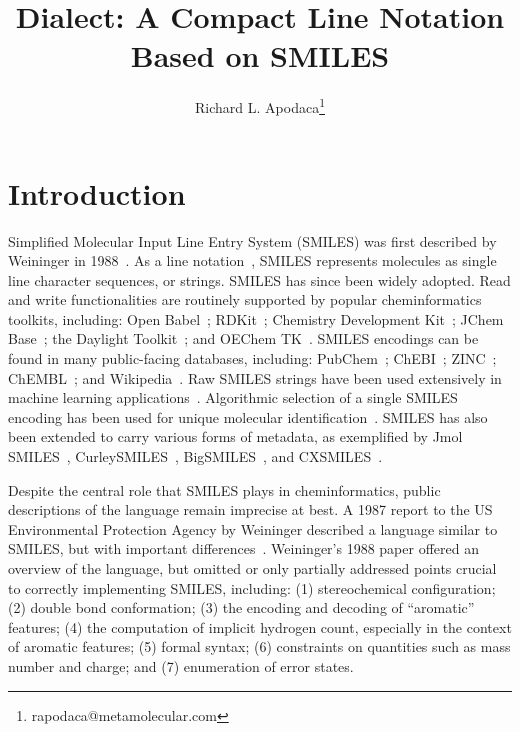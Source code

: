 \documentclass{article}
\begin{document}
\lstset{basicstyle=\ttfamily,breaklines=true}


\title{Dialect: A Compact Line Notation Based on SMILES}
\author{Richard L. Apodaca\thanks{rapodaca@metamolecular.com}}

\maketitle

\section*{Introduction}

Simplified Molecular Input Line Entry System (SMILES) was first described by Weininger in 1988~\cite{weininger:1988}. As a line notation~\cite{wiswesser:1968}, SMILES represents molecules as single line character sequences, or strings. SMILES has since been widely adopted. Read and write functionalities are routinely supported by popular cheminformatics toolkits, including: Open Babel~\cite{oBoyle:2011}; RDKit~\cite{rdkit}; Chemistry Development Kit~\cite{steinbeck:2003}; JChem Base~\cite{jchemBase}; the Daylight Toolkit~\cite{daylightToolkit}; and OEChem TK~\cite{oetk}. SMILES encodings can be found in many public-facing databases, including: PubChem~\cite{kim:2016}; ChEBI~\cite{degtyarenko:2007}; ZINC~\cite{irwin:2005}; ChEMBL~\cite{gaulton:2012}; and Wikipedia~\cite{wikipediaCAS}. Raw SMILES strings have been used extensively in machine learning applications~\cite{sousa:2021}. Algorithmic selection of a single SMILES encoding has been used for unique molecular identification~\cite{weininger:1989,oBoyle:2012}. SMILES has also been extended to carry various forms of metadata, as exemplified by Jmol SMILES~\cite{hanson:2016}, CurleySMILES~\cite{drefahl:2011}, BigSMILES~\cite{lin:2019}, and CXSMILES~\cite{cxsmiles}.

Despite the central role that SMILES plays in cheminformatics, public descriptions of the language remain imprecise at best. A 1987 report to the US Environmental Protection Agency by Weininger described a language similar to SMILES, but with important differences~\cite{anderson:1987}. Weininger's 1988 paper offered an overview of the language, but omitted or only partially addressed points crucial to correctly implementing SMILES, including: (1) stereochemical configuration; (2) double bond conformation; (3) the encoding and decoding of \enquote{aromatic} features; (4) the computation of implicit hydrogen count, especially in the context of aromatic features; (5) formal syntax; (6) constraints on quantities such as mass number and charge; and (7) enumeration of error states.
\end{document}

